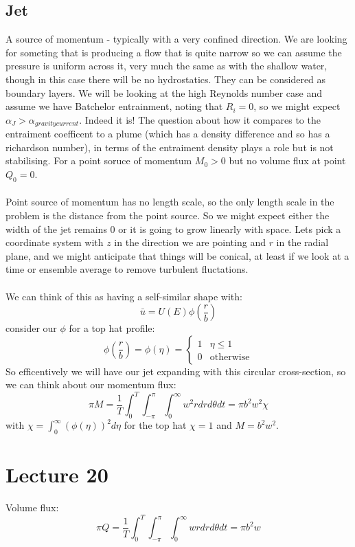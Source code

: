 \documentclass{article}
\begin{document}
\subsection{Jet}
A source of momentum - typically with a very confined direction. We are looking for someting that is producing a flow that is quite narrow so we can assume the pressure is uniform across it, very much the same as with the shallow water, though in this case there will be no hydrostatics. They can be considered as boundary layers. We will be looking at the high Reynolds number case and assume we have Batchelor entrainment, noting that $R_i =  0$, so we might expect $\alpha_J > \alpha_{gravity current}$. Indeed it is! The question about how it compares to the entraiment coefficent to a plume (which has a density difference and so has a richardson number), in terms of the entraiment density plays a role but is not stabilising. For a point soruce of momentum $M_0 > 0$ but no volume flux at point $Q_0 = 0$.\\\\
Point source of momentum has no length scale, so the only length scale in the problem is the distance from the point source. So we might expect either the width of the jet remains $0$ or it is going to grow linearly with space. Lets pick a coordinate system with $z$ in the direction we are pointing and $r$ in the radial plane, and we might anticipate that things will be conical, at least if we look at a time or ensemble average to remove turbulent fluctations.\\\\
We can think of this as having a self-similar shape with:
$$
 \bar u = U ( E) \phi( \frac{r}{b})
$$
consider our $\phi$ for a top hat profile:
$$
 \phi(\frac{r}{b}) = \phi( \eta) = \begin{cases} 1 & \eta \leq 1\\ 0 & \text{otherwise} \end{cases}
$$
So efficentively we will have our jet expanding with this circular cross-section, so we can think about our momentum flux:
$$
 \pi M = \frac{1}{T} \int^{T}_0 \int_{-\pi}^{\pi} \int_0^{\infty} w^2 r dr d\theta d t = \pi b^2 w^2 \chi
$$
with $\chi = \int_0^{\infty} (\phi(\eta))^2 d\eta$ for the top hat $\chi =1$ and $M = b^2 w^2$.\section{Lecture 20}
Volume flux:
$$
 \pi Q = \frac{1}{T} \int_0^T \int^{\pi}_{-\pi} \int^{\infty}_0 w r dr d\theta dt = \pi b^2 w
$$
\end{document}
